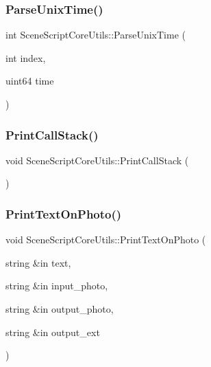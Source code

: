 \hypertarget{class_scene_script_core_utils_a9decb7a6ccb332314d9cffa1bf60350a}{}\label{class_scene_script_core_utils_a9decb7a6ccb332314d9cffa1bf60350a} 
\subsubsection{\texorpdfstring{Parse\+Unix\+Time()}{ParseUnixTime()}}
{\footnotesize\ttfamily int Scene\+Script\+Core\+Utils\+::\+Parse\+Unix\+Time (\begin{DoxyParamCaption}\item[{int}]{index,  }\item[{uint64}]{time }\end{DoxyParamCaption})}

\hypertarget{class_scene_script_core_utils_af8ac8f7da38488059e7d927b48be5547}{}\label{class_scene_script_core_utils_af8ac8f7da38488059e7d927b48be5547} 
\subsubsection{\texorpdfstring{Print\+Call\+Stack()}{PrintCallStack()}}
{\footnotesize\ttfamily void Scene\+Script\+Core\+Utils\+::\+Print\+Call\+Stack (\begin{DoxyParamCaption}{ }\end{DoxyParamCaption})}

\hypertarget{class_scene_script_core_utils_a64328eb589865efe2bf2703782fc2d3e}{}\label{class_scene_script_core_utils_a64328eb589865efe2bf2703782fc2d3e} 
\subsubsection{\texorpdfstring{Print\+Text\+On\+Photo()}{PrintTextOnPhoto()}}
{\footnotesize\ttfamily void Scene\+Script\+Core\+Utils\+::\+Print\+Text\+On\+Photo (\begin{DoxyParamCaption}\item[{string \&in}]{text,  }\item[{string \&in}]{input\+\_\+photo,  }\item[{string \&in}]{output\+\_\+photo,  }\item[{string \&in}]{output\+\_\+ext }\end{DoxyParamCaption})}

